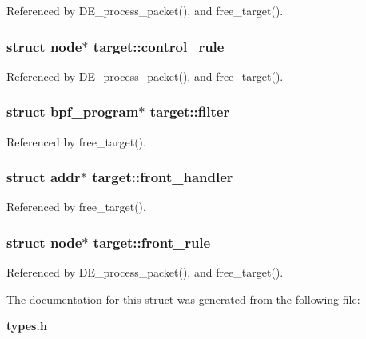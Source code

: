 Referenced by DE\_\-process\_\-packet(), and free\_\-target().
\subsubsection[{control\_\-rule}]{\setlength{\rightskip}{0pt plus 5cm}struct {\bf node}$\ast$ {\bf target::control\_\-rule}\hspace{0.3cm}{\tt  [read]}}\label{structtarget_6a6586f002149f586211a06f0a718245}




Referenced by DE\_\-process\_\-packet(), and free\_\-target().
\subsubsection[{filter}]{\setlength{\rightskip}{0pt plus 5cm}struct bpf\_\-program$\ast$ {\bf target::filter}\hspace{0.3cm}{\tt  [read]}}\label{structtarget_b494a11d3a116512f82ea9b2cca0b2ec}




Referenced by free\_\-target().
\subsubsection[{front\_\-handler}]{\setlength{\rightskip}{0pt plus 5cm}struct addr$\ast$ {\bf target::front\_\-handler}\hspace{0.3cm}{\tt  [read]}}\label{structtarget_cd395fe8f2035b8614602734d57d567c}




Referenced by free\_\-target().
\subsubsection[{front\_\-rule}]{\setlength{\rightskip}{0pt plus 5cm}struct {\bf node}$\ast$ {\bf target::front\_\-rule}\hspace{0.3cm}{\tt  [read]}}\label{structtarget_741b1a152f8a2ba803e6960a0f5ac25c}




Referenced by DE\_\-process\_\-packet(), and free\_\-target().

The documentation for this struct was generated from the following file:\begin{CompactItemize}
\item 
{\bf types.h}\end{CompactItemize}
